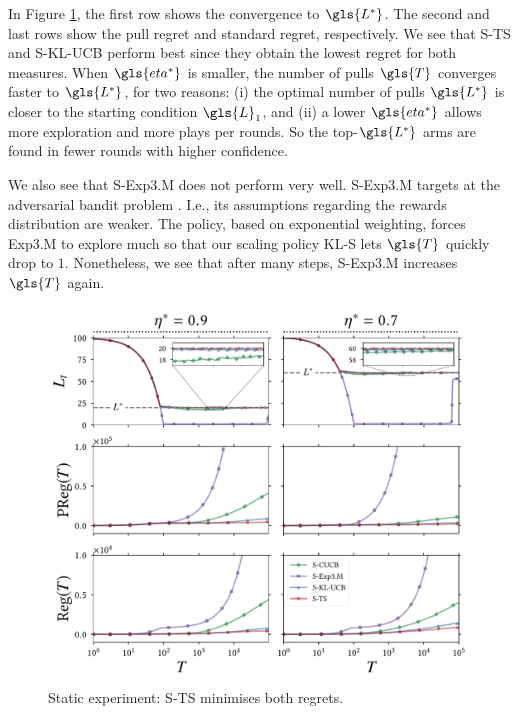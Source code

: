 In Figure \ref{static_experiment}, the first row shows the convergence to $\gls{L^*}$. The second and last rows show the pull regret and standard regret, respectively. We see that \gls{S-TS} and \gls{S-KL-UCB} perform best since they obtain the lowest regret for both measures.
When $\gls{eta^*}$ is smaller, the number of pulls ${\gls{T}}$ converges faster to $\gls{L^*}$, for two reasons: (i) the optimal number of pulls $\gls{L^*}$ is closer to the starting condition $\gls{L}_1$, and (ii) a lower $\gls{eta^*}$ allows more exploration and more plays per rounds.
So the top-$\gls{L^*}$ arms are found in fewer rounds with higher confidence. 

We also see that S-\gls{Exp3.M} does not perform very well. 
S-\gls{Exp3.M} targets at the adversarial bandit problem \cite{DBLP:conf/alt/UchiyaNK10}. I.e., its assumptions regarding the rewards distribution are weaker.
The policy, based on exponential weighting, forces \gls{Exp3.M} to explore much so that our scaling policy \gls{KL-S} lets ${\gls{T}}$ quickly drop to $1$. Nonetheless, we see that after many steps, S-\gls{Exp3.M} increases ${\gls{T}}$ again.  

\begin{figure}[ht]
	\centering
		\includegraphics[width=0.9\linewidth, trim=0cm 0cm 0cm 0.0cm]{part3-figures/static_experiment_s-2-compressed.pdf}
\caption{Static experiment: \gls{S-TS} minimises both regrets.}
\label{static_experiment}
\end{figure}

